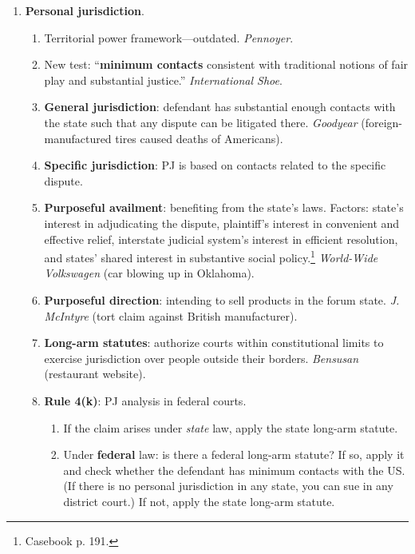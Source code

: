 \begin{enumerate}
    \item \textbf{Personal jurisdiction}.
    \begin{enumerate}
        \item Territorial power framework---outdated. \emph{Pennoyer}.
        \item New test: ``\textbf{minimum contacts} consistent with 
        traditional notions of fair play and substantial justice.'' 
        \emph{International Shoe}.
        \item \textbf{General jurisdiction}: defendant has substantial enough 
        contacts with the state such that any dispute can be litigated there. 
        \emph{Goodyear} (foreign-manufactured tires caused deaths of 
        Americans).
        \item \textbf{Specific jurisdiction}: PJ is based on contacts related 
        to the specific dispute.
        \item \textbf{Purposeful availment}: benefiting from the state's laws. 
        Factors: state's interest in adjudicating the dispute, plaintiff's 
        interest in convenient and effective relief, interstate judicial 
        system's interest in efficient resolution, and states' shared interest 
        in substantive social policy.\footnote{Casebook p. 191.}
        \emph{World-Wide Volkswagen} (car blowing up in Oklahoma).
        \item \textbf{Purposeful direction}: intending to sell products in the 
        forum state. \emph{J. McIntyre} (tort claim against British 
        manufacturer).
        \item \textbf{Long-arm statutes}: authorize courts within 
        constitutional limits to exercise jurisdiction over people outside 
        their borders. \emph{Bensusan} (restaurant website).
        \item \textbf{Rule 4(k)}: PJ analysis in federal courts.  
        \begin{enumerate}
            \item If the claim arises under \emph{state} law, apply the state 
            long-arm statute.
            \item Under \textbf{federal} law: is there a federal long-arm 
            statute? If so, apply it and check whether the defendant has 
            minimum contacts with the US.  (If there is no personal 
            jurisdiction in any state, you can sue in any district court.) If 
            not, apply the state long-arm statute.  \end{enumerate}

\end{enumerate}
\end{enumerate}
